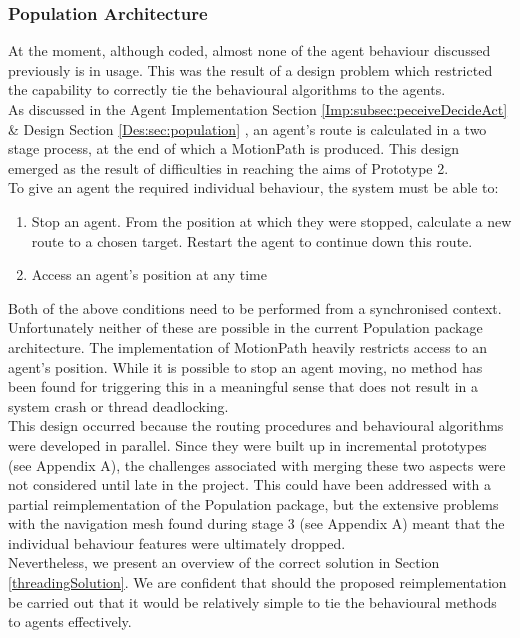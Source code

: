 \subsubsection{Population Architecture}
At the moment, although coded, almost none of the agent behaviour discussed previously is in usage. This was the result of a design problem which restricted the capability to correctly tie the behavioural algorithms to the agents.\\
As discussed in the Agent Implementation Section \ref{Imp:subsec:peceiveDecideAct} \& Design Section \ref{Des:sec:population} , an agent's route is calculated in a two stage process, at the end of which a MotionPath is produced. This design emerged as the result of difficulties in reaching the aims of Prototype 2.\\
To give an agent the required individual behaviour, the system must be able to:
\begin{enumerate}
\item{Stop an agent. From the position at which they were stopped, calculate a new route to a chosen target. Restart the agent to continue down this route.}
\item{Access an agent's position at any time}
\end{enumerate}
Both of the above conditions need to be performed from a synchronised context. Unfortunately neither of these are possible in the current Population package architecture. The implementation of MotionPath heavily restricts access to an agent's position. While it is possible to stop an agent moving, no method has been found for triggering this in a meaningful sense that does not result in a system crash or thread deadlocking.\\
This design occurred because the routing procedures and behavioural algorithms were developed in parallel. Since they were built up in incremental prototypes (see Appendix A), the challenges associated with merging these two aspects were not considered until late in the project. This could have been addressed with a partial reimplementation of the Population package, but the extensive problems with the navigation mesh found during stage 3 (see Appendix A) meant that the individual behaviour features were ultimately dropped.\\
Nevertheless, we present an overview of the correct solution in Section \ref{threadingSolution}. We are confident that should the proposed reimplementation be carried out that it would be relatively simple to tie the behavioural methods to agents effectively.
